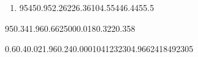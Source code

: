 
\begin{question}
    
    \begin{enumerate}[label={\textbf{\alph*)}}]

        \item  

            \begin{formula2}
                {95}{450.95}{2.2622}{6.36}{10}{4.55}{446.4}{455.5}
            \end{formula2}
    
    \end{enumerate}
\end{question}


\begin{question}

    \begin{formula3} 
        {95}{0.34}{1.96}{0.66}{2500}{0.018}{0.322}{0.358}
    \end{formula3}

\end{question}


\begin{question}
    
    \begin{formula4} 
        {0.6}{0.4}{0.02}{1.96}{0.24}{0.000104123}{2304.966241849}{2305}
    \end{formula4}

\end{question}


